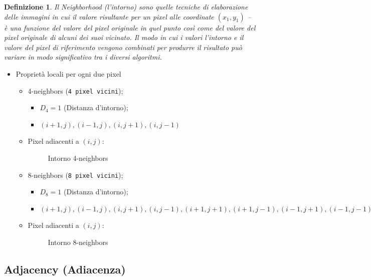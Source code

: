 \documentclass{report}
\newtheorem{defi}{Definizione}[section]
\begin{document}
\begin{defi}
  Il Neighborhood (l'intorno) sono quelle tecniche di elaborazione delle
  immagini in cui il valore risultante per un pixel alle coordinate
  $(x_1,y_1)$ -- è una funzione del valore del pixel originale in quel
  punto così come del valore del pixel originale di alcuni dei suoi
  vicinato. Il modo in cui i valori l'intorno e il valore del pixel di
  riferimento vengono combinati per produrre il risultato può variare
  in modo significativo tra i diversi algoritmi.
\end{defi}
\clearpage
\begin{itemize}
\item Proprietà locali per ogni due pixel
  \begin{itemize}
  \item 4-neighbors (\texttt{4 pixel vicini});
    \begin{itemize}
    \item $D_4 = 1$ (Distanza d'intorno);
    \item $(i+1, j), (i-1, j), (i, j+1), (i, j-1)$
    \end{itemize}
  \item Pixel adiacenti a $(i, j)$:
    \begin{figure}[ht!]
      \centering
      
      \caption{Intorno 4-neighbors}
      \label{fig:4-neigh}
    \end{figure}
  \item 8-neighbors (\texttt{8 pixel vicini});
    \begin{itemize}
    \item $D_8 = 1$ (Distanza d'intorno);
    \item $(i+1, j), (i-1, j), (i, j+1), (i, j-1), (i+1, j+1),
      (i+1, j-1), (i-1, j+1), (i-1, j-1)$
    \end{itemize}
  \item Pixel adiacenti a $(i, j)$:
    \begin{figure}[ht!]
      \centering
      
      \caption{Intorno 8-neighbors}
      \label{fig:8-neigh}
    \end{figure}    
  \end{itemize}
\end{itemize}

\subsection{Adjacency (Adiacenza)}
\label{sec:adjacency}
\end{document}

